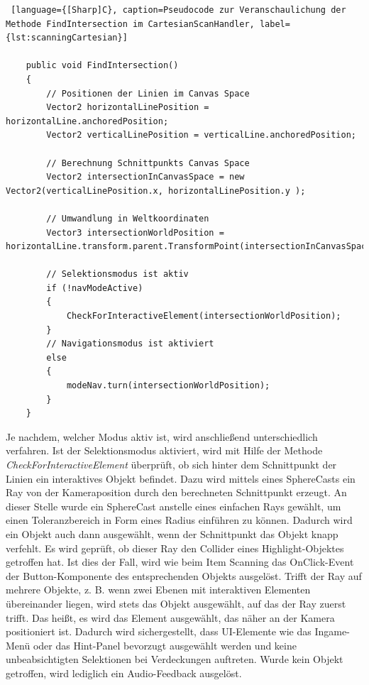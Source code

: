 \begin{lstlisting} [language={[Sharp]C}, caption=Pseudocode zur Veranschaulichung der Methode FindIntersection im CartesianScanHandler, label={lst:scanningCartesian}]

    public void FindIntersection()
    {
        // Positionen der Linien im Canvas Space
        Vector2 horizontalLinePosition = horizontalLine.anchoredPosition;
        Vector2 verticalLinePosition = verticalLine.anchoredPosition;
        
        // Berechnung Schnittpunkts Canvas Space
        Vector2 intersectionInCanvasSpace = new Vector2(verticalLinePosition.x, horizontalLinePosition.y );
        
        // Umwandlung in Weltkoordinaten
        Vector3 intersectionWorldPosition = horizontalLine.transform.parent.TransformPoint(intersectionInCanvasSpace);

        // Selektionsmodus ist aktiv
        if (!navModeActive)
	    {
            CheckForInteractiveElement(intersectionWorldPosition);
        }
        // Navigationsmodus ist aktiviert
        else
        {
            modeNav.turn(intersectionWorldPosition);
        }
    }

\end{lstlisting}

Je nachdem, welcher Modus aktiv ist, wird anschließend unterschiedlich verfahren. Ist der Selektionsmodus aktiviert, wird mit Hilfe der Methode \textit{CheckForInteractiveElement} überprüft, ob sich hinter dem Schnittpunkt der Linien ein interaktives Objekt befindet. Dazu wird mittels eines SphereCasts ein Ray von der Kameraposition durch den berechneten Schnittpunkt erzeugt. An dieser Stelle wurde ein SphereCast anstelle eines einfachen Rays gewählt, um einen Toleranzbereich in Form eines Radius einführen zu können. Dadurch wird ein Objekt auch dann ausgewählt, wenn der Schnittpunkt das Objekt knapp verfehlt. Es wird geprüft, ob dieser Ray den Collider eines Highlight-Objektes getroffen hat. Ist dies der Fall, wird wie beim Item Scanning das OnClick-Event der Button-Komponente des entsprechenden Objekts ausgelöst. Trifft der Ray auf mehrere Objekte, z. B.  wenn zwei Ebenen mit interaktiven Elementen übereinander liegen, wird stets das Objekt ausgewählt, auf das der Ray zuerst trifft. Das heißt, es wird das Element ausgewählt, das näher an der Kamera positioniert ist. Dadurch wird sichergestellt, dass UI-Elemente wie das Ingame-Menü oder das Hint-Panel bevorzugt ausgewählt werden und keine unbeabsichtigten Selektionen bei Verdeckungen auftreten. Wurde kein Objekt getroffen, wird lediglich ein Audio-Feedback ausgelöst. 

